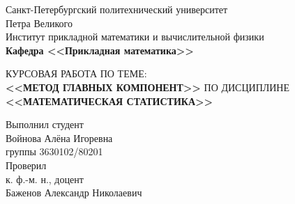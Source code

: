 \documentclass[main.tex]{subfiles}
\begin{document}
\begin{titlepage}
\begin{center}
	\begin{large}
		Санкт-Петербургский политехнический университет\\ Петра Великого\\		
		\vspace{\baselineskip}
		Институт прикладной математики и вычислительной физики\\
		\textbf{Кафедра <<Прикладная математика>>}\\
	\end{large}
	\vfill
	\Large{{КУРСОВАЯ РАБОТА ПО ТЕМЕ:\\\textbf{<<МЕТОД ГЛАВНЫХ КОМПОНЕНТ>>}
	ПО ДИСЦИПЛИНЕ \\\textbf{<<МАТЕМАТИЧЕСКАЯ СТАТИСТИКА>>}}}
\end{center}
\vfill
\begin{flushright}	
	Выполнил студент\\
	Войнова Алёна Игоревна\\
	группы 3630102/80201\\
	\vspace{\baselineskip}	
	Проверил\\
	к. ф.-м. н., доцент\\
	Баженов Александр Николаевич
\end{flushright}
\vfill
{}
\end{titlepage}
\end{document}
